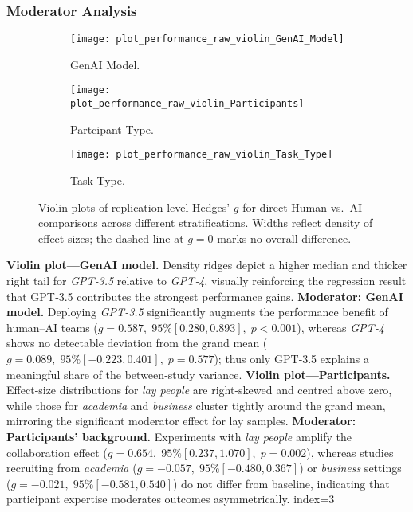 \documentclass[manuscript, screen, review, acmsmall, anonymous]{acmart}
\begin{document}
\subsubsection{Moderator Analysis}
\begin{figure}[h]
  \centering
  \begin{subfigure}[t]{0.33\linewidth}
    \centering
    \texttt{[image: plot\_performance\_raw\_violin\_GenAI\_Model]}
    \caption{GenAI Model.}
    \label{fig:perf_violin_genai_model}
  \end{subfigure}\hfill
  \begin{subfigure}[t]{0.33\linewidth}
    \centering
    \texttt{[image: plot\_performance\_raw\_violin\_Participants]}
    \caption{Partcipant Type.}
    \label{fig:perf_violin_participants}
  \end{subfigure}\hfill
  \begin{subfigure}[t]{0.33\linewidth}
    \centering
    \texttt{[image: plot\_performance\_raw\_violin\_Task\_Type]}
    \caption{Task Type.}
    \label{fig:perf_violin_task_type}
  \end{subfigure}
  \caption{Violin plots of replication-level Hedges' \(g\) for direct Human vs.\ AI comparisons across different stratifications.  Widths reflect density of effect sizes; the dashed line at \(g=0\) marks no overall difference.}
  \label{fig:perf_raw_violins}
\end{figure}
\textbf{Violin plot—GenAI model.} Density ridges depict a higher median and thicker right tail for \textit{GPT‑3.5} relative to \textit{GPT‑4}, visually reinforcing the regression result that GPT‑3.5 contributes the strongest performance gains. 
\textbf{Moderator: GenAI model.} Deploying \textit{GPT‑3.5} significantly augments the performance benefit of human–AI teams (\(g = 0.587,\;95\% [0.280, 0.893],\;p < 0.001\)), whereas \textit{GPT‑4} shows no detectable deviation from the grand mean (\(g = 0.089,\;95\% [-0.223, 0.401],\;p = 0.577\)); thus only GPT‑3.5 explains a meaningful share of the between‑study variance.
\textbf{Violin plot—Participants.} Effect‑size distributions for \emph{lay people} are right‑skewed and centred above zero, while those for \emph{academia} and \emph{business} cluster tightly around the grand mean, mirroring the significant moderator effect for lay samples. 
\textbf{Moderator: Participants’ background.} Experiments with \emph{lay people} amplify the collaboration effect (\(g = 0.654,\;95\% [0.237, 1.070],\;p = 0.002\)), whereas studies recruiting from \emph{academia} (\(g = -0.057,\;95\% [-0.480, 0.367]\)) or \emph{business} settings (\(g = -0.021,\;95\% [-0.581, 0.540]\)) do not differ from baseline, indicating that participant expertise moderates outcomes asymmetrically. {index=3}
\end{document}
